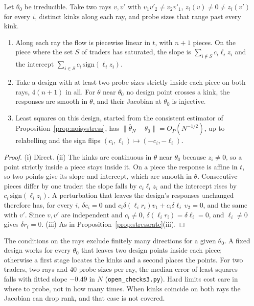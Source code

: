 \begin{proposition}\label{prop:hardrate}
Let $\theta_0$ be irreducible. Take two rays $v,v'$ with $v_1v'_2\ne v_2v'_1$, $z_i(v)\ne0\ne z_i(v')$ for every $i$, distinct kinks along each ray, and probe sizes that range past every kink.
\begin{enumerate}[label=(\roman*),itemsep=1pt]
\item Along each ray the flow is piecewise linear in $t$, with $n+1$ pieces. On the piece where the set $S$ of traders has saturated, the slope is $\sum_{i\notin S}c_i\ell_iz_i$ and the intercept $\sum_{i\in S}c_i\,\mathrm{sign}(\ell_iz_i)$.
\item Take a design with at least two probe sizes strictly inside each piece on both rays, $4(n+1)$ in all. For $\theta$ near $\theta_0$ no design point crosses a kink, the responses are smooth in $\theta$, and their Jacobian at $\theta_0$ is injective.
\item Least squares on this design, started from the consistent estimator of Proposition~\ref{prop:noisystress}, has $\|\hat\theta_N-\theta_0\|=O_P(N^{-1/2})$, up to relabelling and the sign flips $(c_i,\ell_i)\mapsto(-c_i,-\ell_i)$.
\end{enumerate}
\end{proposition}

\begin{proof}
(i) Direct. (ii) The kinks are continuous in $\theta$ near $\theta_0$ because $z_i\ne0$, so a point strictly inside a piece stays inside it. On a piece the response is affine in $t$, so two points give its slope and intercept, which are smooth in $\theta$. Consecutive pieces differ by one trader: the slope falls by $c_i\ell_iz_i$ and the intercept rises by $c_i\,\mathrm{sign}(\ell_iz_i)$. A perturbation that leaves the design's responses unchanged therefore has, for every $i$, $\delta c_i=0$ and $c_i\delta(\ell_ir_i)v_1+c_i\delta\ell_i\,v_2=0$, and the same with $v'$. Since $v,v'$ are independent and $c_i\ne0$, $\delta(\ell_ir_i)=\delta\ell_i=0$, and $\ell_i\ne0$ gives $\delta r_i=0$. (iii) As in Proposition~\ref{prop:stressrate}(iii).
\end{proof}

The conditions on the rays exclude finitely many directions for a given $\theta_0$. A fixed design works for every $\theta_0$ that leaves two design points inside each piece; otherwise a first stage locates the kinks and a second places the points. For two traders, two rays and 40 probe sizes per ray, the median error of least squares falls with fitted slope $-0.49$ in $N$ (\nolinkurl{open_checks3.py}). Hard limits cost care in where to probe, not in how many times. When kinks coincide on both rays the Jacobian can drop rank, and that case is not covered.

